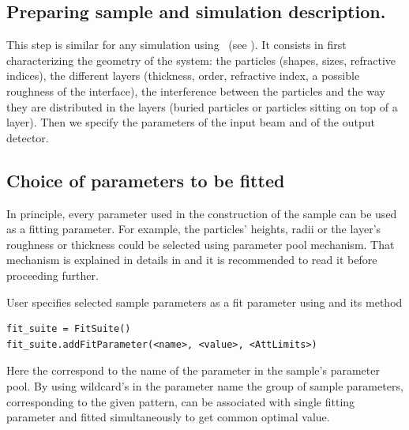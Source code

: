 %
\subsection{Preparing sample and simulation description.}

This step is similar for any simulation using \BornAgain\ (see ). It consists in first characterizing  the geometry of the system: the particles 
(shapes, sizes, refractive
indices), the different layers (thickness,
order, refractive index, a possible roughness of the interface), the
interference between the particles and the way they are distributed in
the layers (buried particles or particles sitting on top of a
layer). 
Then we specify the parameters of the input beam and of the
output detector.


%
\subsection{Choice of parameters to be fitted}
In principle, every parameter used in the construction of the sample
can be used as a fitting parameter. For example, the particles'
heights, radii or the layer's roughness or thickness could be selected using
parameter pool mechanism. 
That mechanism is explained in details in  and it is recommended to read it before proceeding further.

User specifies selected sample parameters as a fit parameter using 
and its  method

\begin{lstlisting}[language=shell, style=commandline]
fit_suite = FitSuite()
fit_suite.addFitParameter(<name>, <value>, <AttLimits>)
\end{lstlisting}

Here the  correspond to the name of the parameter in the sample's parameter pool.
By using wildcard's in the parameter name the group of sample parameters, corresponding to the given
pattern, can be associated with single fitting parameter and 
fitted simultaneously to get common optimal value.


